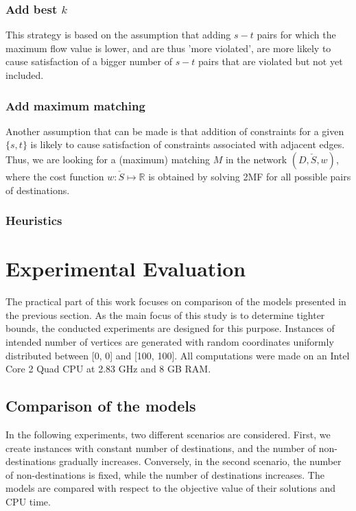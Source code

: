 \subsubsection{Add best $k$}

This strategy is based on the assumption that adding $s-t$ pairs for which the maximum flow value is lower, and are thus 'more violated', are more likely to cause satisfaction of a bigger number of $s-t$ pairs that are violated but not yet included.

\subsubsection{Add maximum matching}

Another assumption that can be made is that addition of constraints for a given $\{s,t\}$ is likely to cause satisfaction of constraints associated with adjacent edges. Thus, we are looking for a (maximum) matching $M$ in the network $(D,\check{S},w)$, where the cost function $w:\check{S}\mapsto\mathbb{R}$ is obtained by solving 2MF for all possible pairs of destinations.

\subsubsection{Heuristics}



\section{Experimental Evaluation}
\label{sec:exp}

The practical part of this work focuses on comparison of the models presented in the previous section. As the main focus of this study is to determine tighter bounds, the conducted experiments are designed for this purpose. Instances of intended number of vertices are generated with random coordinates uniformly distributed between [0, 0] and [100, 100]. All computations were made on an Intel Core 2 Quad CPU at 2.83 GHz and 8 GB RAM. 
\newpage
\subsection{Comparison of the models}


\label{sec:conclusion}
In the following experiments, two different scenarios are considered. First, we create instances with constant number of destinations, and the number of non-destinations gradually increases. Conversely, in the second scenario, the number of non-destinations is fixed, while the number of destinations increases. The models are compared with respect to the objective value of their solutions and CPU time.


